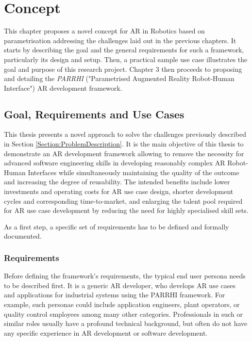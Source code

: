\chapter{Concept}\label{Chap:Concept}

This chapter proposes a novel concept for AR in Robotics based on parametrisation addressing the challenges laid out in the previous chapters. It starts by describing the goal and the general requirements for such a framework, particularly its design and setup. Then, a  practical sample use case illustrates the goal and purpose of this research project. Chapter 3 then proceeds to proposing and detailing the \textit{PARRHI} ("Parametrised Augmented Reality Robot-Human Interface")  AR development framework.

\section{Goal, Requirements and Use Cases}
This thesis presents a novel approach to solve the challenges previously described in Section \ref{Section:ProblemDescription}. It is the main objective of this thesis to demonstrate an AR development framework allowing to remove the necessity for advanced software engineering skills in developing reasonably complex AR Robot-Human Interfaces while simultaneously maintaining the quality of the outcome and increasing the degree of reusability. The intended benefits include lower investments and operating costs for AR use case design, shorter development cycles and corresponding time-to-market, and enlarging the talent pool required for AR use case development by reducing the need for highly specialised skill sets.

As a first step, a specific set of requirements has to be defined and formally documented.

\subsection{Requirements}\label{Section:Requirements}

Before defining the framework’s requirements, the typical end user persona needs to be described first. It is a generic AR developer, who develops AR use cases and applications for industrial systems using the PARRHI framework. For example, such personae could include application engineers, plant operators, or quality control employees among many other categories. Professionals in such or similar roles usually have a profound technical background, but often do not have any specific experience in AR development or software development.

